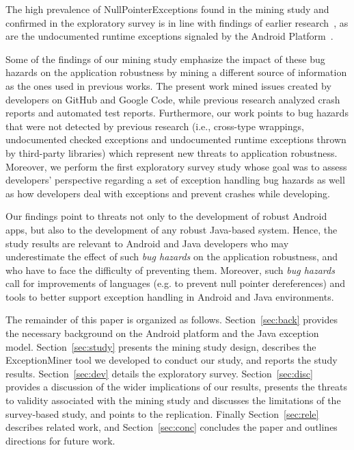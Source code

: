  The high prevalence of NullPointerExceptions found in the mining study and confirmed in the exploratory survey
 is in line with findings of earlier research~\cite{kim2013predicting,fraser20131600,csallner2004jcrasher},
as are the undocumented runtime exceptions signaled by the Android Platform~\cite{kechagia2014}.

Some of the findings of our mining study emphasize the impact of these bug hazards on the application robustness
by mining a different source of information as the ones used in previous works. The present work
mined issues created by developers on GitHub and Google Code, while  previous research analyzed crash reports and automated test reports.
 Furthermore, our work points to bug hazards that were not detected by previous research (i.e., cross-type wrappings, undocumented checked exceptions and undocumented runtime exceptions thrown by third-party libraries) which represent new threats to application robustness.
Moreover, we perform  the first exploratory survey study whose
goal was to assess developers' perspective regarding a set of exception handling bug hazards
as well as how developers deal with exceptions and prevent crashes while developing.

Our findings point to threats not only to the development of robust Android apps,
but also to the development of any robust Java-based system.
Hence, the study results are relevant to Android and Java developers who may underestimate the effect of such
 \emph{bug hazards} on the application robustness,
and who have to face the difficulty of preventing them.
Moreover, such \emph{bug hazards}
call for improvements of languages (e.g. to prevent null pointer dereferences) and tools
 to better support exception handling in Android and Java environments.


The remainder of this paper is organized as follows.
Section~\ref{sec:back} provides the necessary
background on the Android platform and the Java exception model.
Section~\ref{sec:study} presents the mining study design, describes the ExceptionMiner tool
we developed to conduct our study, and reports the study results.
Section~\ref{sec:dev} details the exploratory survey.
Section~\ref{sec:disc} provides a discussion of the wider implications of our results,
 presents the threats to validity associated with the mining study and discusses the limitations
of the survey-based study, and points to the replication.
Finally Section~\ref{sec:rele} describes related work,
and Section~\ref{sec:conc} concludes the paper and outlines
directions for future work.
